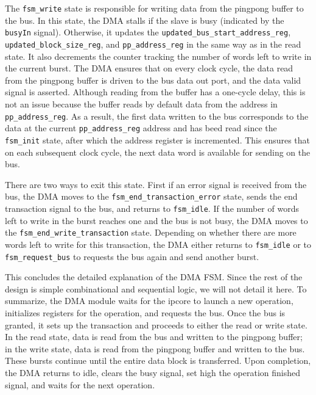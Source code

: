 \documentclass[a4paper,11pt,oneside]{report}
\begin{document}
The \texttt{fsm\_write} state is responsible for writing data from the pingpong buffer to the bus.  
In this state, the DMA stalls if the slave is busy (indicated by the \texttt{busyIn} signal).  
Otherwise, it updates the \texttt{updated\_bus\_start\_address\_reg}, \texttt{updated\_block\_size\_reg}, and \texttt{pp\_address\_reg} in the same way as in the read state.  
It also decrements the counter tracking the number of words left to write in the current burst.  
The DMA ensures that on every clock cycle, the data read from the pingpong buffer is driven to the bus data out port, and the data valid signal is asserted.  
Although reading from the buffer has a one-cycle delay, this is not an issue because the buffer reads by default data from the address in \texttt{pp\_address\_reg}.  
As a result, the first data written to the bus corresponds to the data at the current \texttt{pp\_address\_reg} address and has beed read since the \texttt{fsm\_init} state, after which the address register is incremented. 
This ensures that on each subsequent clock cycle, the next data word is available for sending on the bus.

There are two ways to exit this state.  
First if an error signal is received from the bus, the DMA moves to the \texttt{fsm\_end\_transaction\_error} state, sends the end transaction signal to the bus, and returns to \texttt{fsm\_idle}.  
If the number of words left to write in the burst reaches one and the bus is not busy, the DMA moves to the \texttt{fsm\_end\_write\_transaction} state.  
Depending on whether there are more words left to write for this transaction, the DMA either returns to \texttt{fsm\_idle} or to \texttt{fsm\_request\_bus} to requests the bus again and send another burst.

This concludes the detailed explanation of the DMA FSM.  
Since the rest of the design is simple combinational and sequential logic, we will not detail it here.  
To summarize, the DMA module waits for the ipcore to launch a new operation, initializes registers for the operation, and requests the bus.  
Once the bus is granted, it sets up the transaction and proceeds to either the read or write state.  
In the read state, data is read from the bus and written to the pingpong buffer;  
in the write state, data is read from the pingpong buffer and written to the bus.  
These bursts continue until the entire data block is transferred.  
Upon completion, the DMA returns to idle, clears the busy signal, set high the operation finished signal, and waits for the next operation.
\end{document}
